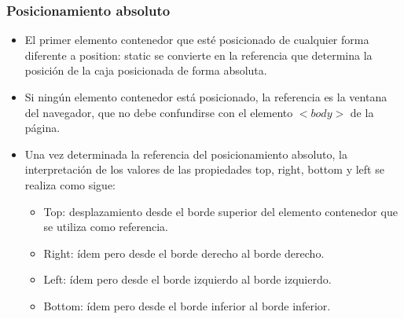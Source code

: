 
\begin{frame}
\frametitle{Posicionamiento absoluto}

\begin{itemize}
  \item El primer elemento contenedor que esté posicionado de cualquier forma diferente a position: static se convierte en la referencia que determina la posición de la caja posicionada de forma absoluta.
  \item Si ningún elemento contenedor está posicionado, la referencia es la ventana del navegador, que no debe confundirse con el elemento $<body>$ de la página.
  \item Una vez determinada la referencia del posicionamiento absoluto, la interpretación de los valores de las propiedades top, right, bottom y left se realiza como sigue:
  \begin{itemize}
    \item Top: desplazamiento desde el borde superior del elemento contenedor que se utiliza como referencia.
    \item Right: ídem pero desde el borde derecho al borde derecho.
    \item Left:  ídem pero desde el borde izquierdo al borde izquierdo.
    \item Bottom: ídem pero desde el borde inferior al borde inferior.
  \end{itemize}
\end{itemize}

\end{frame}



